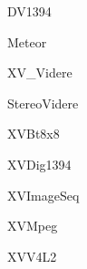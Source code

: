 \begin{CompactList}
\item {}
\item {}
\begin{CompactList}
\item {}
\end{CompactList}
\item {}
\begin{CompactList}
\item DV1394\item Meteor\item XV\_\-Videre\begin{CompactList}
\item Stereo\-Videre\end{CompactList}
\item XVBt8x8\item XVDig1394\item XVImage\-Seq\item XVMpeg\item XVV4L2\end{CompactList}
\end{CompactList}
